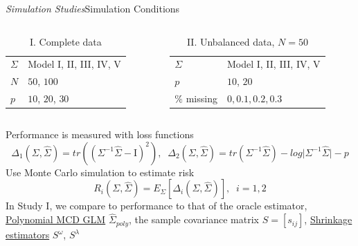 \begin{frame}{\emph{Simulation Studies}}{Simulation Conditions}\label{simulation-studies-benchmark-estimators}

	\begin{columns}
	\begin{column}[T]{5.5cm}
	\footnotesize
	\centering
	\begin{table}
	\caption*{I. Complete data}
	\begin{tabular}{|l|l|}
	\hline
	$\Sigma$ & Model I, II, III, IV, V \\
	$N$ & $50$, $100$ \\
	$p$ & $10$, $20$, $30$\\
	\hline
	\end{tabular}
	\end{table}
	\end{column}
	\begin{column}[T]{5.5cm}
	\centering
	\footnotesize
	\begin{table}
	\caption*{II. Unbalanced data, $N = 50$}
	\begin{tabular}{|l|l|}
	\hline
	$\Sigma$ & Model I, II, III, IV, V \\
	$p$ & $10$, $20$ \\
	$\%$ missing & $0, 0.1, 0.2, 0.3$	\\
	\hline
	\end{tabular}
	\end{table}
	\end{column}	
	\end{columns}
\footnotesize
Performance is measured with loss functions	
	\[
	\Delta_1\left(\Sigma,\hat{\Sigma} \right) = tr\left(\left( \Sigma^{-1} \hat{\Sigma} - \mathrm{I}\right)^2 \right),\;\;	\Delta_2\left(\Sigma,\hat{\Sigma}\right) = tr\left( \Sigma^{-1} \hat{\Sigma} \right) - log \vert \Sigma^{-1} \hat{\Sigma} \vert - p
	\]
	Use Monte Carlo simulation to estimate risk 
	\[
	R_i \left(\Sigma,\hat{\Sigma}\right) = E_\Sigma\left[\Delta_i\left(\Sigma,\hat{\Sigma}\right)\right],\;\;i = 1,2
	\]
	In Study I, we compare to performance to that of the oracle estimator, \hyperlink{polynomial-mcd-model}{Polynomial MCD GLM} $\hat{\Sigma}_{poly}$, the sample covariance matrix $S = \left[s_{ij}\right]$, \hyperlink{shrinkage-estimators}{Shrinkage estimators} $S^\omega$, $S^\lambda$

	

\end{frame}
